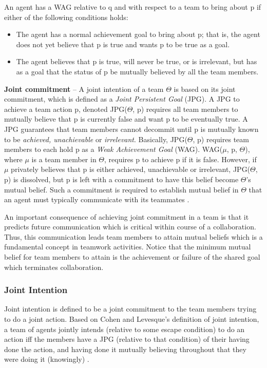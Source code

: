 \documentclass[11pt]{article}
\begin{document}
An agent has a WAG relative to q and with respect to a team to bring about p if
either of the following conditions holds:

\begin{itemize}
  \item The agent has a normal achievement goal to bring about p; that is, the
  agent does not yet believe that p is true and wants p to be true as a goal.
  \item The agent believes that p is true, will never be true, or is irrelevant,
  but has as a goal that the status of p be mutually believed by all the team
  members.
\end{itemize}

\textbf{Joint commitment} -- A joint intention of a team $\Theta$ is based on
its joint commitment, which is defined as a \textit{Joint Persistent Goal}
(JPG). A JPG to achieve a team action p, denoted JPG($\Theta$, p) requires all
team members to mutually believe that p is currently false and want p to be
eventually true. A JPG guarantees that team members cannot decommit until p is
mutually known to be \textit{achieved, unachievable} or \textit{irrelevant}.
Basically, JPG($\Theta$, p) requires team members to each hold p as a
\textit{Weak Achievement Goal} (WAG). WAG($\mu$, p, $\Theta$), where $\mu$ is a
team member in $\Theta$, requires p to achieve p if it is false. However, if
$\mu$ privately believes that p is either achieved, unachievable or irrelevant,
JPG($\Theta$, p) is dissolved, but p is left with a commitment to have this
belief become $\Theta$'s mutual belief. Such a commitment is required to
establish mutual belief in $\Theta$ that an agent must typically communicate
with its teammates \cite{cohen:teamwork}.

An important consequence of achieving joint commitment in a team is that it
predicts future communication which is critical within course of a
collaboration. Thus, this communication leads team members to attain mutual
beliefs which is a fundamental concept in teamwork activities. Notice that
the minimum mutual belief for team members to attain is the achievement or
failure of the shared goal which terminates collaboration.

\subsubsection{Joint Intention}

Joint intention is defined to be a joint commitment to the team members trying
to do a joint action. Based on Cohen and Levesque's definition of joint
intention, a team of agents jointly intends (relative to some escape condition)
to do an action iff the members have a JPG (relative to that condition) of their
having done the action, and having done it mutually believing throughout that
they were doing it (knowingly) \cite{cohen:teamwork}.
\end{document}
